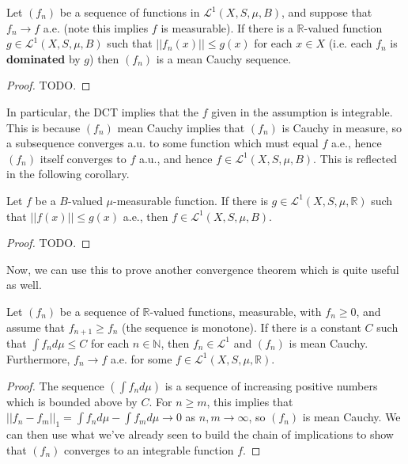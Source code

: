	\begin{theorem}
		Let $(f_n)$ be a sequence of functions in $\mathcal L^1(X, S, \mu, B)$, and suppose that $f_n\rightarrow f$ a.e. 
		(note this implies $f$ is measurable). If there is a $\mathbb R$-valued function $g\in\mathcal L^1(X, S, \mu, B)$ 
		such that $||f_n(x)||\leq g(x)$ for each $x\in X$ (i.e. each $f_n$ is \textbf{dominated} by $g$) then $(f_n)$ is a 
		mean Cauchy sequence. 
	\end{theorem}
	
	\begin{proof}
		TODO.
	\end{proof}
	
	In particular, the DCT implies that the $f$ given in the assumption is integrable. This is because $(f_n)$ mean Cauchy 
	implies that $(f_n)$ is Cauchy in measure, so a subsequence converges a.u. to some function which must equal $f$ 
	a.e., hence $(f_n)$ itself converges to $f$ a.u., and hence $f\in\mathcal L^1(X, S, \mu, B)$. This is reflected in the 
	following corollary.
	
	\begin{corollary}
		Let $f$ be a $B$-valued $\mu$-measurable function. If there is $g\in\mathcal L^1(X, S, \mu, \mathbb R)$ such that 
		$||f(x)||\leq g(x)$ a.e., then $f\in\mathcal L^1(X, S, \mu, B)$. 
	\end{corollary}
	
	\begin{proof}
		TODO.
	\end{proof}
	
	Now, we can use this to prove another convergence theorem which is quite useful as well.
	
	\begin{theorem}
		Let $(f_n)$ be a sequence of $\mathbb R$-valued functions, measurable, with $f_n\geq 0$, and assume that 
		$f_{n + 1}\geq f_n$ (the sequence is monotone). If there is a constant $C$ such that $\int f_nd\mu\leq C$ 
		for each $n\in\mathbb N$, then $f_n\in\mathcal L^1$ and $(f_n)$ is mean Cauchy. Furthermore, $f_n\rightarrow f$
		a.e. for some $f\in\mathcal L^1(X, S, \mu, \mathbb R)$. 
	\end{theorem}
	
	\begin{proof}
		The sequence $(\int f_nd\mu)$ is a sequence of increasing positive numbers which is bounded above by $C$. 
		For $n\geq m$, this implies that $||f_n - f_m||_1 = \int f_nd\mu - \int f_md\mu\rightarrow 0$ as $n, m\rightarrow
		\infty$, so $(f_n)$ is mean Cauchy. We can then use what we've already seen to build the chain of implications 
		to show that $(f_n)$ converges to an integrable function $f$. 
	\end{proof}
	

